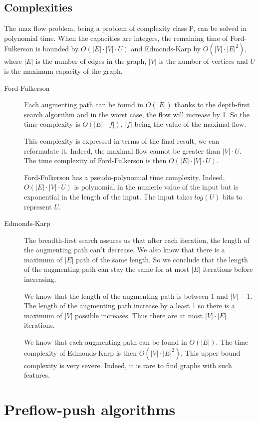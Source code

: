 \subsection{Complexities}
The max flow problem, being a problem of complexity class P, can be solved in polynomial time. When the capacities are integers, the remaining time of Ford-Fulkerson is bounded by $O(|E|\cdot |V|\cdot U)$ and Edmonds-Karp by $O(|V|\cdot |E|^2)$, where $|E|$ is the number of edges in the graph, $|V|$ is the number of vertices and $U$ is the maximum capacity of the graph.

\begin{description}
\item[Ford-Fulkerson]{Each augmenting path can be found in $O(|E|)$ thanks to the depth-first search algorithm and in the worst case, the flow will increase by 1. So the time complexity is $O(|E|\cdot |f|)$, $|f|$ being the value of the maximal flow. 

This complexity is expressed in terms of the final result, we can reformulate it. Indeed, the maximal flow cannot be greater than $|V|\cdot U$. The time complexity of Ford-Fulkerson is then $O(|E|\cdot |V|\cdot U)$.

Ford-Fulkerson has a pseudo-polynomial time complexity. Indeed, $O(|E|\cdot |V|\cdot U)$ is polynomial in the numeric value of the input but is exponential in the length of the input. The input takes $log(U)$ bits to represent $U$.}

\item[Edmonds-Karp]{The breadth-first search assures us that after each iteration, the length of the augmenting path can't decrease. We also know that there is a maximum of $|E|$ path of the same length. So we conclude that the length of the augmenting path can stay the same for at most $|E|$ iterations before increasing. 

We know that the length of the augmenting path is between $1$ and $|V|-1$. The length of the augmenting path increase by a least 1 so there is a maximum of $|V|$ possible increases. Thus there are at most $|V|\cdot |E|$ iterations.

We know that each augmenting path can be found in $O(|E|)$. The time complexity of Edmonds-Karp is then $O(|V|\cdot |E|^2)$. This upper bound complexity is very severe. Indeed, it is rare to find graphs with such features.}
\end{description}



\section{Preflow-push algorithms}
\label{sec:preflow}

